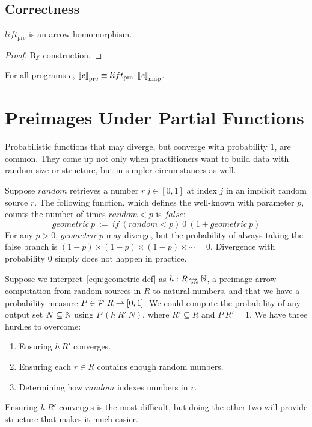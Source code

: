 \documentclass[preprint]{sigplanconf}
\newcommand{\arrow}{\rightsquigarrow}
\newcommand{\pto}{\rightharpoonup}
\newcommand{\arrowlift}{\ensuremath{lift}}
\newcommand{\map}{_\mathrm{map}}
\newcommand{\pre}{_\mathrm{pre}}
\DeclareMathOperator{\preto}{\arrow_{\mspace{-19mu}\pre}}
\newcommand{\liftpre}{\arrowlift\pre}
\begin{document}
\subsection{Correctness}

\begin{theorem}
$\liftpre$ is an arrow homomorphism.
\label{thm:liftpre-homomorphism}
\end{theorem}
\begin{proof}
By construction.
\end{proof}

\begin{corollary}
For all programs $\mathit{e}$, $\meaningof{\mathit{e}}\pre \equiv \liftpre~\meaningof{\mathit{e}}\map$.
\label{cor:preimage-arrow-correctness}
\end{corollary}

\section{Preimages Under Partial Functions}

Probabilistic functions that may diverge, but converge with probability 1, are common.
They come up not only when practitioners want to build data with random size or structure, but in simpler circumstances as well.

Suppose $random$ retrieves a number $r~j \in [0,1]$ at index $j$ in an implicit random source $r$.
The following function, which defines the well-known  with parameter $p$, counts the number of times $random < p$ is $false$:
\begin{equation}
	geometric~p \ := \ if~(random < p)~0~(1 + geometric~p)
\label{eqn:geometric-def}
\end{equation}
For any $p > 0$, $geometric~p$ may diverge, but the probability of always taking the false branch is $(1-p) \times (1-p) \times (1-p) \times \cdots = 0$.
Divergence with probability $0$ simply does not happen in practice.

Suppose we interpret~\eqref{eqn:geometric-def} as $h : R \preto \Nat$, a preimage arrow computation from random sources in $R$ to natural numbers, and that we have a probability measure $P \in \powerset~R \pto [0,1]$.
We could compute the probability of any output set $N \subseteq \mathbb{N}$ using $P~(h~R'~N)$, where $R' \subseteq R$ and $P~R' = 1$. We have three hurdles to overcome:
\begin{enumerate}
	\item Ensuring $h~R'$ converges.
	\item Ensuring each $r \in R$ contains enough random numbers.
	\item Determining how $random$ indexes numbers in $r$.
\end{enumerate}
Ensuring $h~R'$ converges is the most difficult, but doing the other two will provide structure that makes it much easier.
\end{document}
